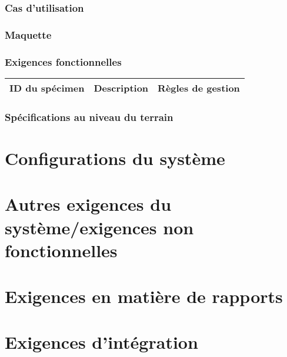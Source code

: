 \documentclass[a4paper,12pt]{report}  %
\begin{document}
	\subsubsection{Cas d'utilisation}
	
	\subsubsection{Maquette}
	
	\subsubsection{Exigences fonctionnelles}
	\begin{longtable}{|l|l|l|}
		\hline
		\textbf{ID du spécimen} & \textbf{Description} & \textbf{Règles de gestion} \\
		\hline
	\end{longtable}
	
	\subsubsection{Spécifications au niveau du terrain}
	
	\section{Configurations du système}
	
	\section{Autres exigences du système/exigences non fonctionnelles}
	
	\section{Exigences en matière de rapports}
	
	\section{Exigences d'intégration}
	
\end{document}
